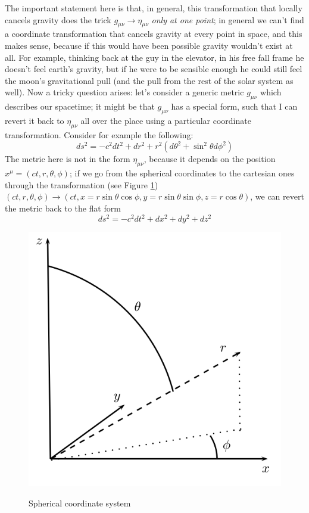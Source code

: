 The important statement here is that, in general, this transformation that locally cancels gravity does the trick $g_{\mu\nu}\rightarrow \eta_{\mu\nu}$ \textit{only at one point}; in general we can't find a coordinate transformation that cancels gravity at every point in space, and this makes sense, because if this would have been possible gravity wouldn't exist at all. For example, thinking back at the guy in the elevator, in his free fall frame he doesn't feel earth's gravity, but if he were to be sensible enough he could still feel the moon's gravitational pull (and the pull from the rest of the solar system as well). Now a tricky question arises: let's consider a generic metric $g_{\mu\nu}$ which describes our spacetime; it might be that $g_{\mu\nu}$ has a special form, such that I can revert it back to $\eta_{\mu\nu}$ all over the place using a particular coordinate transformation. Consider for example the following: 
\begin{equation}
\label{metspher}
ds^2=-c^2dt^2+dr^2+r^2(d\theta^2+\sin^2{\theta}d\phi^2)
\end{equation}
The metric here is not in the form $\eta_{\mu\nu}$, because it depends on the position $x^\mu=(ct,r,\theta,\phi)$; if we go from the spherical coordinates to the cartesian ones through the transformation (see Figure \ref{coordinates}) $(ct,r,\theta,\phi)\rightarrow(ct,x=r\sin{\theta}\cos{\phi},y=r\sin{\theta}\sin{\phi},z=r\cos{\theta})$, we can revert the metric back to the flat form 
\begin{equation}
ds^2=-c^2dt^2+dx^2+dy^2+dz^2
\end{equation}
\begin{figure}
\begin{center}
\includegraphics[scale=0.7]{Draw/coordinates.png}
\label{}
\end{center}
\caption{Spherical coordinate system}
\label{coordinates}
\end{figure}

